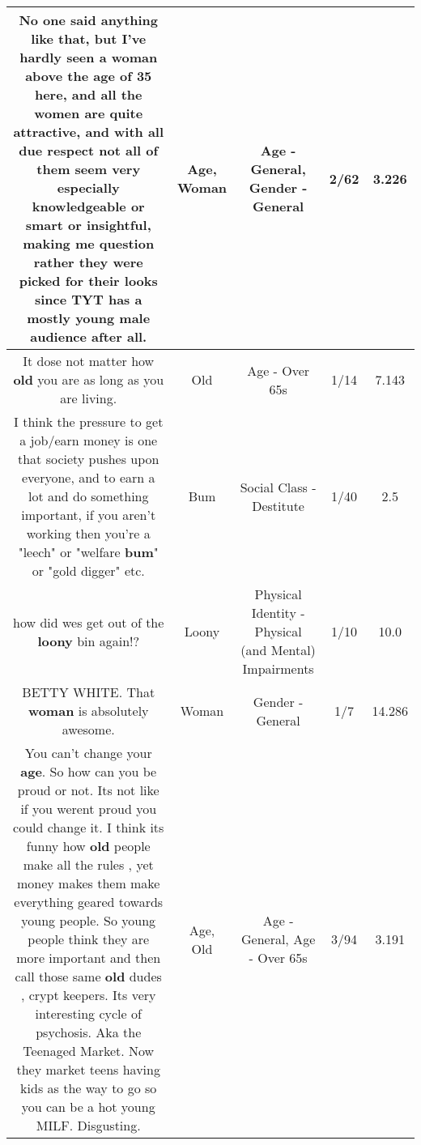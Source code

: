 \documentclass[11pt]{article}
\newlength\mylength
\begin{document}
\begin{center}
\begin{longtable}{|C{.65\mylength}|C{.30\mylength}|C{.12\mylength}|C{.12\mylength}|C{.12\mylength}|}
  \small No one said anything like that, but I've hardly seen a \textbf{woman} above the \textbf{age} of 35 here, and all the women are quite attractive, and with all due respect not all of them seem very especially knowledgeable or smart or insightful, making me question rather they were picked for their looks since TYT has a mostly young male audience after all.\normalsize   & Age, Woman & Age - General, Gender - General & 2/62 & 3.226 \\  \hline
  \small It dose not matter how \textbf{old} you are as long as you are living.\normalsize   & Old & Age - Over 65s & 1/14 & 7.143 \\  \hline
  \small I think the pressure to get a job/earn money is one that society pushes upon everyone, and to earn a lot and do something important, if you aren't working then you're a "leech" or "welfare \textbf{bum}" or "gold digger" etc.\normalsize   & Bum & Social Class - Destitute & 1/40 & 2.5 \\  \hline
  \small how did wes get out of the \textbf{loony} bin again!?\normalsize   & Loony & Physical Identity - Physical (and Mental) Impairments & 1/10 & 10.0 \\  \hline
  \small BETTY WHITE. That \textbf{woman} is absolutely awesome.\normalsize   & Woman & Gender - General & 1/7 & 14.286 \\  \hline
  \small You can't change your \textbf{age}. So how can you be proud or not. Its not like if you werent proud you could change it. I think its funny how \textbf{old} people make all the rules , yet money makes them make everything geared towards young people. So young people think they are more important and then call those same \textbf{old} dudes , crypt keepers. Its very interesting cycle of psychosis. Aka the Teenaged Market. Now they market teens having kids as the way to go so you can be a hot young MILF. Disgusting.\normalsize   & Age, Old & Age - General, Age - Over 65s & 3/94 & 3.191 \\  \hline

\end{longtable}
\end{center}
\end{document}
